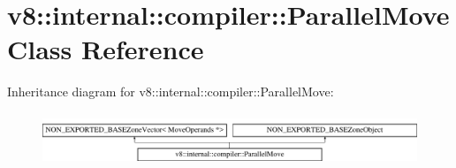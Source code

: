 \hypertarget{classv8_1_1internal_1_1compiler_1_1ParallelMove}{}\section{v8\+:\+:internal\+:\+:compiler\+:\+:Parallel\+Move Class Reference}
\label{classv8_1_1internal_1_1compiler_1_1ParallelMove}
Inheritance diagram for v8\+:\+:internal\+:\+:compiler\+:\+:Parallel\+Move\+:\begin{figure}[H]
\begin{center}
\leavevmode
\includegraphics[height=1.604584cm]{classv8_1_1internal_1_1compiler_1_1ParallelMove}
\end{center}
\end{figure}
